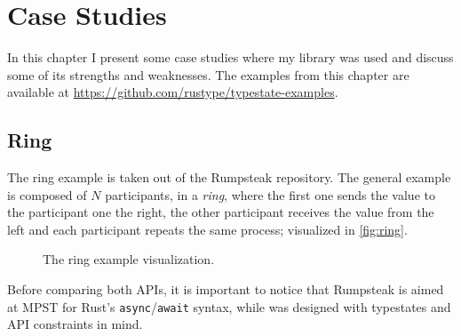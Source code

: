 

\chapter{Case Studies}\label{cha:case-study}

In this chapter I present some case studies where my library was used and discuss some of its strengths and weaknesses.
The examples from this chapter are available at \url{https://github.com/rustype/typestate-examples}.

\section{Ring}

The ring example is taken out of the Rumpsteak \autocite{Cutner2021} repository.
The general example is composed of $N$ participants, in a \emph{ring},
where the first one sends the value to the participant one the right,
the other participant receives the value from the left and each participant repeats the same process;
visualized in \autoref{fig:ring}.

\begin{figure}
    \centering
    \caption{The ring example visualization.}
    \label{fig:ring}
\end{figure}

Before comparing both APIs, it is important to notice that Rumpsteak is aimed at \gls{MPST}
for Rust's \texttt{async}/\texttt{await} syntax,
while  was designed with typestates and API constraints in mind.



